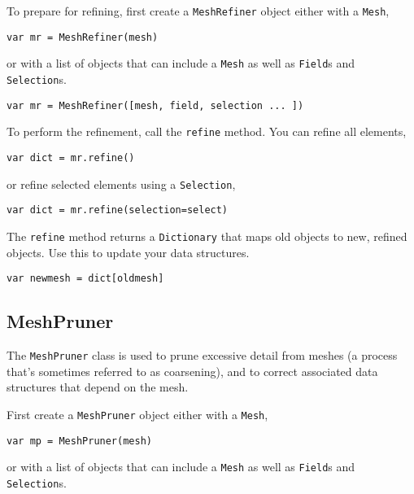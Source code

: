 To prepare for refining, first create a \texttt{MeshRefiner} object
either with a \texttt{Mesh},

\begin{lstlisting}
var mr = MeshRefiner(mesh)
\end{lstlisting}

or with a list of objects that can include a \texttt{Mesh} as well as
\texttt{Field}s and \texttt{Selection}s.

\begin{lstlisting}
var mr = MeshRefiner([mesh, field, selection ... ])
\end{lstlisting}

To perform the refinement, call the \texttt{refine} method. You can
refine all elements,

\begin{lstlisting}
var dict = mr.refine()
\end{lstlisting}

or refine selected elements using a \texttt{Selection},

\begin{lstlisting}
var dict = mr.refine(selection=select)
\end{lstlisting}

The \texttt{refine} method returns a \texttt{Dictionary} that maps old
objects to new, refined objects. Use this to update your data
structures.

\begin{lstlisting}
var newmesh = dict[oldmesh]
\end{lstlisting}

\hypertarget{meshpruner}{%
\subsection{MeshPruner}\label{meshpruner}}

The \texttt{MeshPruner} class is used to prune excessive detail from
meshes (a process that's sometimes referred to as coarsening), and to
correct associated data structures that depend on the mesh.

First create a \texttt{MeshPruner} object either with a \texttt{Mesh},

\begin{lstlisting}
var mp = MeshPruner(mesh)
\end{lstlisting}

or with a list of objects that can include a \texttt{Mesh} as well as
\texttt{Field}s and \texttt{Selection}s.

